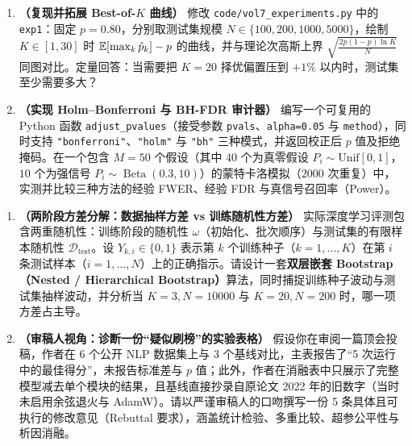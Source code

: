 \begin{enumerate}[label=\textbf{7.1.\arabic*}, start=5]
  \item \textbf{（复现并拓展 Best-of-$K$ 曲线）} 修改 \texttt{code/vol7\_experiments.py} 中的 \texttt{exp1}：固定 $p = 0.80$，分别取测试集规模 $N \in \{100, 200, 1000, 5000\}$，绘制 $K \in [1, 30]$ 时 $\mathbb{E}[\max_k \hat{p}_k] - p$ 的曲线，并与理论次高斯上界 $\sqrt{\frac{2p(1-p)\ln K}{N}}$ 同图对比。定量回答：当需要把 $K=20$ 择优偏置压到 $+1\%$ 以内时，测试集至少需要多大？

  \item \textbf{（实现 Holm--Bonferroni 与 BH-FDR 审计器）} 编写一个可复用的 Python 函数 \texttt{adjust\_pvalues}（接受参数 \texttt{pvals}、\texttt{alpha=0.05} 与 \texttt{method}），同时支持 \texttt{"bonferroni"}、\texttt{"holm"} 与 \texttt{"bh"} 三种模式，并返回校正后 $p$ 值及拒绝掩码。在一个包含 $M=50$ 个假设（其中 $40$ 个为真零假设 $P_i \sim \mathrm{Unif}[0,1]$，$10$ 个为强信号 $P_i \sim \operatorname{Beta}(0.3, 10)$）的蒙特卡洛模拟（$2000$ 次重复）中，实测并比较三种方法的经验 FWER、经验 FDR 与真信号召回率（Power）。
\end{enumerate}


\begin{enumerate}[label=\textbf{7.1.\arabic*}, start=7]
  \item \textbf{（两阶段方差分解：数据抽样方差 vs 训练随机性方差）} 实际深度学习评测包含两重随机性：训练阶段的随机性 $\omega$（初始化、批次顺序）与测试集的有限样本随机性 $\mathcal{D}_{\text{test}}$。设 $Y_{k,i} \in \{0,1\}$ 表示第 $k$ 个训练种子（$k=1,\dots,K$）在第 $i$ 条测试样本（$i=1,\dots,N$）上的正确指示。请设计一套\textbf{双层嵌套 Bootstrap（Nested / Hierarchical Bootstrap）}算法，同时捕捉训练种子波动与测试集抽样波动，并分析当 $K=3, N=10000$ 与 $K=20, N=200$ 时，哪一项方差占主导。

  \item \textbf{（审稿人视角：诊断一份“疑似刷榜”的实验表格）} 假设你在审阅一篇顶会投稿，作者在 6 个公开 NLP 数据集上与 3 个基线对比，主表报告了“5 次运行中的最佳得分”，未报告标准差与 $p$ 值；此外，作者在消融表中只展示了完整模型减去单个模块的结果，且基线直接抄录自原论文 2022 年的旧数字（当时未启用余弦退火与 AdamW）。请以严谨审稿人的口吻撰写一份 5 条具体且可执行的修改意见（Rebuttal 要求），涵盖统计检验、多重比较、超参公平性与析因消融。
\end{enumerate}
